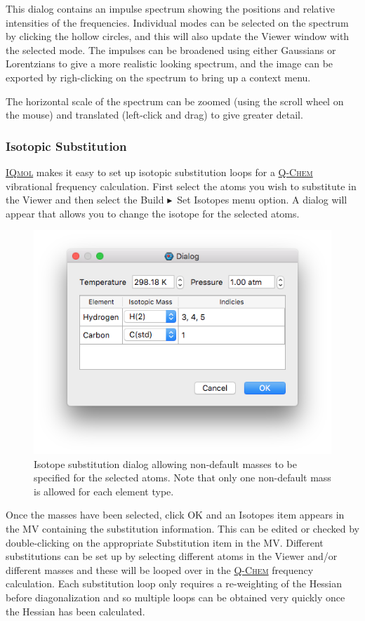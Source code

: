 \documentclass[a4paper,12pt]{article}
\newcommand{\qchem}{\href{http://q-chem.com}{{\scshape Q-Chem}}}
\newcommand{\iqmol}{\href{http://iqmol.org}{{\scshape IQmol}}}
\newcommand{\bt}{\ensuremath{\blacktriangleright}}
\begin{document}
This dialog contains an impulse spectrum showing the positions and relative
intensities of the frequencies.  Individual modes can be selected on the
spectrum by clicking the hollow circles, and this will also update the Viewer
window with the selected mode.  The impulses can be broadened using either
Gaussians or Lorentzians to give a more realistic looking spectrum, and the
image can be exported by righ-clicking on the spectrum to bring up a context
menu.

The horizontal scale of the spectrum can be zoomed (using the scroll wheel on
the mouse) and translated (left-click and drag) to give greater detail.

\subsubsection{Isotopic Substitution}

\iqmol{} makes it easy to set up isotopic substitution loops for a \qchem{}
vibrational frequency calculation.  First select the atoms  you wish to
substitute in the Viewer and then select the Build \bt\ Set Isotopes menu option.
A dialog will appear that allows you to change the isotope for the selected atoms.  
\begin{figure}[h]
\begin{center}
\includegraphics[scale=0.20]{figures/IsotopeDialog.png}
\caption{Isotope substitution dialog allowing non-default masses to be
specified for the selected atoms.  Note that only one non-default mass is
allowed for each element type.}
\end{center}
\end{figure}
Once the masses have been selected, click OK and an Isotopes item appears in
the MV containing the substitution information.  This can be edited or checked
by double-clicking on the appropriate Substitution item in the MV.  Different
substitutions can be set up by selecting different atoms in the Viewer and/or
different masses and these will be looped over in the \qchem{} frequency
calculation.  Each substitution loop only requires a re-weighting of the
Hessian before diagonalization and so multiple loops can be obtained very
quickly once the Hessian has been calculated.
\end{document}
